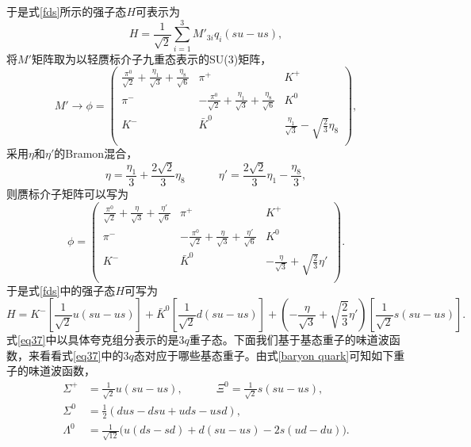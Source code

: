 于是式\eqref{fds}所示的强子态$H$可表示为
\begin{equation}
	\label{eq3a1}
	H=\frac{1}{\sqrt{2}}\sum^{3}_{i=1}M'_{3i}q_{i}(su-us),
\end{equation}
\newpage
将$M'$矩阵取为以轻赝标介子九重态表示的SU(3)矩阵，
\begin{equation}
\label{pseudoscalar meson}
	M'\to\phi=
	\begin{pmatrix}
		\frac{\pi^{0}}{\sqrt{2}}+\frac{\eta_{1}}{\sqrt{3}}+\frac{\eta_{8}}{\sqrt{6}} & \pi^{+} & K^{+} \\
		\pi^{-} & -\frac{\pi^{0}}{\sqrt{2}}+\frac{\eta_{1}}{\sqrt{3}}+\frac{\eta_{8}}{\sqrt{6}} & K^{0} \\
		K^{-} & \bar{K}^{0} & \frac{\eta_{1}}{\sqrt{3}}-\sqrt{\frac{2}{3}}\eta_{8} \\
	\end{pmatrix},
\end{equation}
采用$\eta$和$\eta'$的Bramon混合\cite{BRAMON1992416}，
\begin{equation}
	\eta=\frac{\eta_{1}}{3}+\frac{2\sqrt{2}}{3}\eta_{8}\qquad\quad\eta'=\frac{2\sqrt{2}}{3}\eta_{1}-\frac{\eta_{8}}{3},
\end{equation}
\newpage
则赝标介子矩阵可以写为
\begin{equation}
\label{pseudoscalar meson2}
	\phi=
	\begin{pmatrix}
		\frac{\pi^{0}}{\sqrt{2}}+\frac{\eta}{\sqrt{3}}+\frac{\eta'}{\sqrt{6}} & \pi^{+} & K^{+} \\
		\pi^{-} & -\frac{\pi^{0}}{\sqrt{2}}+\frac{\eta}{\sqrt{3}}+\frac{\eta'}{\sqrt{6}} & K^{0} \\
		K^{-} & \bar{K}^{0} & -\frac{\eta}{\sqrt{3}}+\sqrt{\frac{2}{3}}\eta' \\
	\end{pmatrix}.
\end{equation}
于是式\eqref{fds}中的强子态$H$可写为
\begin{equation}
	\label{eq37}
	H=K^{-}\left[\frac{1}{\sqrt{2}}u(su-us)\right]+\bar{K}^{0}\left[\frac{1}{\sqrt{2}}d(su-us)\right]+\left(-\frac{\eta}{\sqrt{3}}+\sqrt{\frac{2}{3}}\eta'\right)\left[\frac{1}{\sqrt{2}}s(su-us)\right].
\end{equation}
式\eqref{eq37}中以具体夸克组分表示的是$3q$重子态。下面我们基于基态重子的味道波函数，来看看式\eqref{eq37}中的$3q$态对应于哪些基态重子。由式\eqref{baryon quark}可知如下重子的味道波函数，
\begin{equation}
\begin{split}
	\Sigma^{+}&=\frac{1}{\sqrt{2}}u(su-us),\qquad\quad\Xi^{0}=\frac{1}{\sqrt{2}}s(su-us),\\[1ex]
	\Sigma^{0}&=\frac{1}{2}(dus-dsu+uds-usd),\\[1ex]
	\Lambda^{0}&=\frac{1}{\sqrt{12}}\big(u(ds-sd)+d(su-us)-2s(ud-du)\big).
\end{split}
\end{equation}
